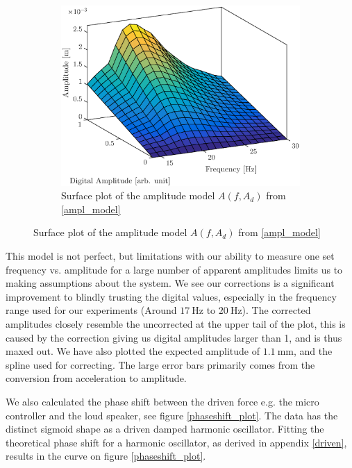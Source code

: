 \documentclass[12pt,oneside,a4paper]{article}
\numberwithin{equation}{section}
\begin{document}
{{{{\begin{figure}[h]
\begin{subfigure}[t]{0.49\textwidth}
		\label{frq_vs_ampl_plot}
	\end{subfigure}\hfill
	\begin{subfigure}[t]{0.49\textwidth}
		\centering
		\includegraphics[width=\textwidth]{surfplot}
		\caption{Surface plot of the amplitude model $A(f,A_{d})$ from \eqref{ampl_model}}
	\end{subfigure}
\end{figure}
This model is not perfect, but limitations with our ability to measure one set frequency vs. amplitude for a large number of apparent amplitudes limits us to making assumptions about the system. We see our corrections is a significant improvement to blindly trusting the digital values, especially in the frequency range used for our experiments (Around $\SI{17}{\hertz}$ to $\SI{20}{\hertz}$). The corrected amplitudes closely resemble the uncorrected at the upper tail of the plot, this is caused by the correction giving us digital amplitudes larger than 1, and is thus maxed out. We have also plotted the expected amplitude of $\SI{1.1}{\mm}$, and the spline used for correcting. The large error bars primarily comes from the conversion from acceleration to amplitude.

We also calculated the phase shift between the driven force e.g. the micro controller and the loud speaker, see figure \ref{phaseshift_plot}. The data has the distinct sigmoid shape as a driven damped harmonic oscillator. Fitting the theoretical phase shift for a harmonic oscillator, as derived in appendix \ref{driven}, results in the curve on figure \ref{phaseshift_plot}.
 
}}}}
\end{document}
